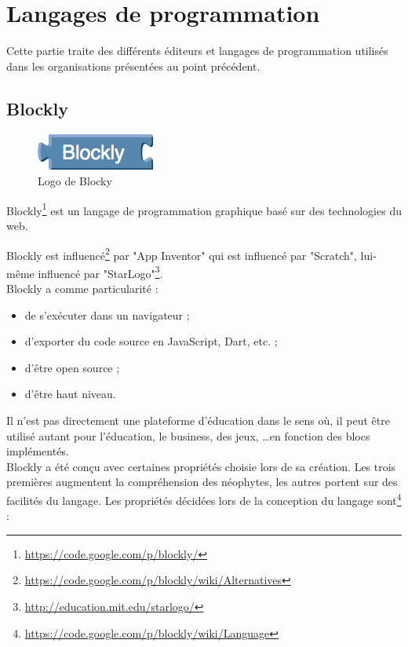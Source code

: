 \section{Langages de programmation}
\label{langages}
Cette partie traite des différents éditeurs et langages de programmation utilisés dans les organisations présentées au point précédent.
\subsection{Blockly}
\label{blockly}
\begin{figure}[!h]
  \begin{center}
    \includegraphics[scale=0.5]{content/5-related_work/images/blocky}
    \caption{Logo de Blocky}
    \label{fig:blocky}
  \end{center}
\end{figure}
Blockly\footnote{\url{https://code.google.com/p/blockly/}} est un langage de programmation graphique basé sur des technologies du web. 

Blockly est influencé\footnote{\url{https://code.google.com/p/blockly/wiki/Alternatives}} par "App Inventor" qui est influencé par "Scratch", lui-même influencé par "StarLogo"\footnote{\url{http://education.mit.edu/starlogo/}}.\\

Blockly a comme particularité :
\begin{itemize}
\item de s'exécuter dans un navigateur ;
\item d'exporter du code source en JavaScript, Dart, etc. ;
\item d'être open source ;
\item d'être haut niveau.
\end{itemize}

Il n'est pas directement une plateforme d'éducation dans le sens où, il peut être utilisé autant pour l'éducation, le business, des jeux, \ldots en fonction des blocs implémentés.\\

Blockly a été conçu avec certaines propriétés choisie lors de sa création. Les trois premières augmentent la compréhension des néophytes, les autres portent sur des facilités du langage. Les propriétés décidées lors de la conception du langage sont\footnote{\url{https://code.google.com/p/blockly/wiki/Language}} :

